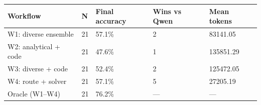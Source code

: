 \begin{tabular}{lllll}
\hline
Workflow & N & Final accuracy & Wins vs Qwen & Mean tokens \\
\hline
W1: diverse ensemble & 21 & 57.1\% & 2 & 83141.05 \\
W2: analytical + code & 21 & 47.6\% & 1 & 135851.29 \\
W3: diverse + code & 21 & 52.4\% & 2 & 125472.05 \\
W4: route + solver & 21 & 57.1\% & 5 & 27205.19 \\
Oracle (W1–W4) & 21 & 76.2\% & — & — \\
\hline
\end{tabular}
